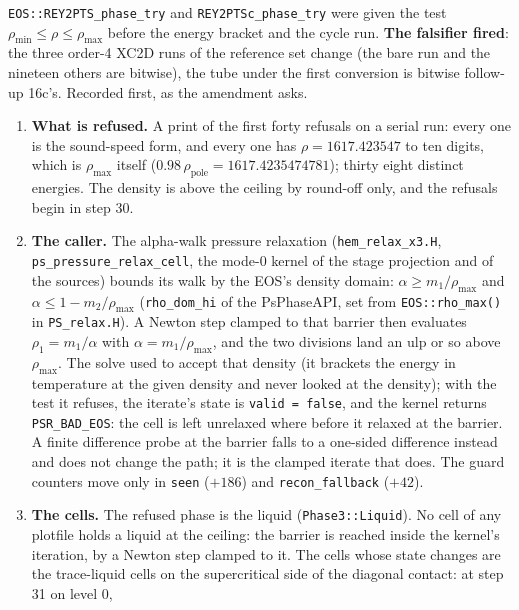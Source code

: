 \documentclass[11pt,a4paper]{article}
\newcommand{\code}[1]{\texttt{\small #1}}
\begin{document}
\code{EOS::REY2PTS\_phase\_try} and \code{REY2PTSc\_phase\_try} were
given the test $\rho_{\min} \le \rho \le \rho_{\max}$ before the energy
bracket and the cycle run.  \textbf{The falsifier fired}: the three
order-4 XC2D runs of the reference set change (the bare run and the
nineteen others are bitwise), the tube under the first conversion is
bitwise follow-up 16c's.  Recorded first, as the amendment asks.
\begin{enumerate}[nosep]
\item \textbf{What is refused.}  A print of the first forty refusals
      on a serial run: every one is the sound-speed form, and every one
      has $\rho = 1617.423547$ to ten digits, which is $\rho_{\max}$
      itself ($0.98\,\rho_{\mathrm{pole}} = 1617.4235474781$); thirty
      eight distinct energies.  The density is above the ceiling by
      round-off only, and the refusals begin in step 30.
\item \textbf{The caller.}  The alpha-walk pressure relaxation
      (\code{hem\_relax\_x3.H}, \code{ps\_pressure\_relax\_cell}, the
      mode-0 kernel of the stage projection and of the sources) bounds
      its walk by the EOS's density domain: $\alpha \ge m_1/\rho_{\max}$
      and $\alpha \le 1 - m_2/\rho_{\max}$ (\code{rho\_dom\_hi} of the
      PsPhaseAPI, set from \code{EOS::rho\_max()} in
      \code{PS\_relax.H}).  A Newton step clamped to that barrier then
      evaluates $\rho_1 = m_1/\alpha$ with $\alpha = m_1/\rho_{\max}$, and
      the two divisions land an ulp or so above $\rho_{\max}$.  The
      solve used to accept that density (it brackets the energy in
      temperature at the given density and never looked at the density);
      with the test it refuses, the iterate's state is \code{valid =
      false}, and the kernel returns \code{PSR\_BAD\_EOS}: the cell is
      left unrelaxed where before it relaxed at the barrier.  A finite
      difference probe at the barrier falls to a one-sided difference
      instead and does not change the path; it is the clamped iterate
      that does.  The guard counters move only in \code{seen} ($+186$)
      and \code{recon\_fallback} ($+42$).
\item \textbf{The cells.}  The refused phase is the liquid (\code{Phase3::Liquid}).  No cell of
      any plotfile holds a liquid at the ceiling: the barrier is reached
      inside the kernel's iteration, by a Newton step clamped to it.
      The cells whose state changes are the trace-liquid cells on the
      supercritical side of the diagonal contact: at step 31 on level 0,

\end{enumerate}
\end{document}
